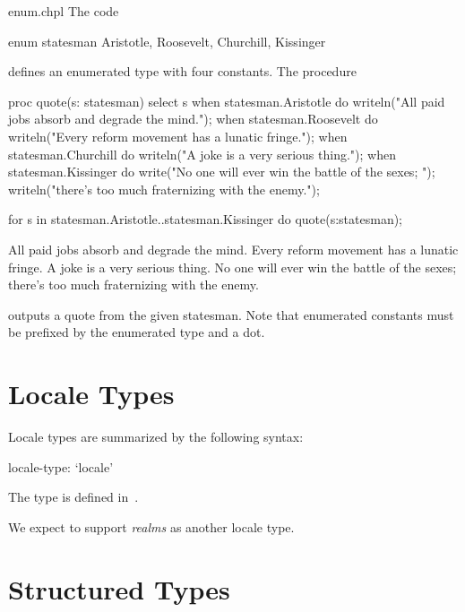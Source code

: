 \begin{chapelexample}{enum.chpl}
The code
\begin{chapel}
enum statesman { Aristotle, Roosevelt, Churchill, Kissinger }
\end{chapel}
defines an enumerated type with four constants.  The procedure
\begin{chapel}
proc quote(s: statesman) {
  select s {
    when statesman.Aristotle do
       writeln("All paid jobs absorb and degrade the mind.");
    when statesman.Roosevelt do
       writeln("Every reform movement has a lunatic fringe.");
    when statesman.Churchill do
       writeln("A joke is a very serious thing.");
    when statesman.Kissinger do
       { write("No one will ever win the battle of the sexes; ");
         writeln("there's too much fraternizing with the enemy."); }
  }
}
\end{chapel}
\begin{chapelnoprint}
for s in statesman.Aristotle..statesman.Kissinger do
  quote(s:statesman);
\end{chapelnoprint}
\begin{chapeloutput}
All paid jobs absorb and degrade the mind.
Every reform movement has a lunatic fringe.
A joke is a very serious thing.
No one will ever win the battle of the sexes; there's too much fraternizing with the enemy.
\end{chapeloutput}
outputs a quote from the given statesman.  Note that enumerated
constants must be prefixed by the enumerated type and a dot.
\end{chapelexample}


\section{Locale Types}
\label{Locale_Types}

Locale types are summarized by the following syntax:

\begin{syntax}
locale-type:
  `locale'
\end{syntax}

The  type is defined in~.

\begin{openissue}
We expect to support \emph{realms} as another locale type.
\end{openissue}

\section{Structured Types}
\label{Structured_Types}

